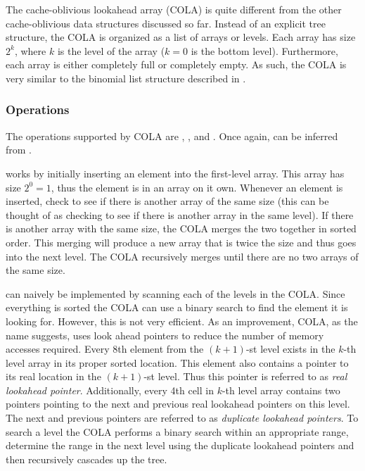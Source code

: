 \documentclass[preprint]{style}
\begin{document}
The cache-oblivious lookahead array (COLA) is quite different from the other
cache-oblivious data structures discussed so far. Instead of an explicit tree
structure, the COLA is organized as a list of arrays or levels. Each array has
size $2^k$, where $k$ is the level of the array ($k = 0$ is the bottom level).
Furthermore, each array is either completely full or completely empty. As such,
the COLA is very similar to the binomial list structure described in
\cite{BentleySaxe}.

\subsubsection{Operations}

The operations supported by COLA are \Search{}, \Insert{}, and \Scan{}. Once
again, \Delete{} can be inferred from \Insert{}.

\Insert{} works by initially inserting an element into the first-level array.
This array has size $2^0 = 1$, thus the element is in an array on it own.
Whenever an element is inserted, check to see if there is another array of
the same size (this can be thought of as checking to see if there is another
array in the same level). If there is another array with the same size, the
COLA merges the two together in sorted order. This merging will produce a new
array that is twice the size and thus goes into the next level. The COLA
recursively merges until there are no two arrays of the same size.

\Search{} can naively be implemented by scanning each of the levels in the
COLA. Since everything is sorted the COLA can use a binary search to find the
element it is looking for. However, this is not very efficient. As an
improvement, COLA, as the name suggests, uses look ahead pointers to reduce the
number of memory accesses required. Every 8th element from the $(k+1)$-st level
exists in the $k$-th level array in its proper sorted location. This element
also contains a pointer to its real location in the $(k+1)$-st level. Thus this
pointer is referred to as \textit{real lookahead pointer}. Additionally, every
4th cell in $k$-th level array contains two pointers pointing to the next and
previous real lookahead pointers on this level. The next and previous pointers
are referred to as \textit{duplicate lookahead pointers}. To search a level the
COLA performs a binary search within an appropriate range, determine the range
in the next level using the duplicate lookahead pointers and then recursively
cascades up the tree.
\end{document}
